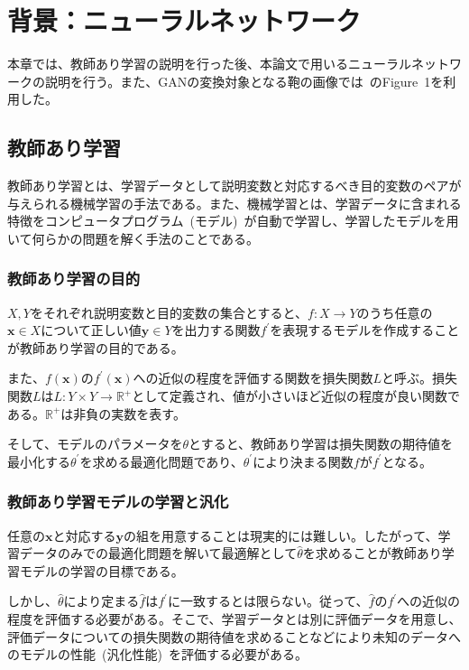 \chapter{背景：ニューラルネットワーク}

本章では、教師あり学習の説明を行った後、本論文で用いるニューラルネットワークの説明を行う。また、GANの変換対象となる鞄の画像では~\cite{pix2pix}のFigure~1を利用した。

\section{教師あり学習}

教師あり学習とは、学習データとして説明変数と対応するべき目的変数のペアが与えられる機械学習の手法である。また、機械学習とは、学習データに含まれる特徴をコンピュータプログラム~(モデル)~が自動で学習し、学習したモデルを用いて何らかの問題を解く手法のことである。

\subsection{教師あり学習の目的}

$X,Y$をそれぞれ説明変数と目的変数の集合とすると、$f:X\rightarrow Y$のうち任意の$\boldsymbol{x} \in X$について正しい値$\boldsymbol{y} \in Y$を出力する関数$f^{'}$を表現するモデルを作成することが教師あり学習の目的である。

また、$f(\boldsymbol{x})$の$f^{'}(\boldsymbol{x})$への近似の程度を評価する関数を損失関数$L$と呼ぶ。損失関数$L$は$L:Y \times Y \rightarrow \mathbb{R}^+$として定義され、値が小さいほど近似の程度が良い関数である。$\mathbb{R}^+$は非負の実数を表す。

そして、モデルのパラメータを$\theta$とすると、教師あり学習は損失関数の期待値を最小化する$\theta^{'}$を求める最適化問題であり、$\theta^{'}$により決まる関数$f$が$f^{'}$となる。

\subsection{教師あり学習モデルの学習と汎化}

任意の$\boldsymbol{x}$と対応する$\boldsymbol{y}$の組を用意することは現実的には難しい。したがって、学習データのみでの最適化問題を解いて最適解として$\hat{\theta}$を求めることが教師あり学習モデルの学習の目標である。

しかし、$\hat{\theta}$により定まる$\hat{f}$は$f^{'}$に一致するとは限らない。従って、$\hat{f}$の$f^{'}$への近似の程度を評価する必要がある。そこで、学習データとは別に評価データを用意し、評価データについての損失関数の期待値を求めることなどにより未知のデータへのモデルの性能~(汎化性能)~を評価する必要がある。

